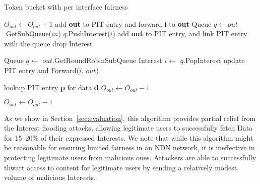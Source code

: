 \begin{algorithm}[h]
\footnotesize
\caption{\small Token bucket with per interface fairness}
\label{alg:queuing}
\begin{algorithmic}[1]
     
\EndFor

\vspace{0.1cm}

     
        \State $O_{out} \leftarrow O_{out} + 1$  
        \State add \textbf{out} to PIT entry and forward \textbf{i} to \textbf{out}
    \Else
        \State Queue $q \leftarrow out$.GetSubQueue($in$)
           \State $q$.PushInterest($i$)
           \State add \textbf{out} to PIT entry, and link PIT entry with the queue
        \Else
           \State drop Interest
        \EndIf
    \EndIf
\EndFunction

\vspace{0.1cm}

\State{} 
    \State Queue $q \leftarrow$ $out$.GetRoundRobinSubQueue 
    \State Interest $i \leftarrow$ $q$.PopInterest
    \State update PIT entry and Forward($i$, $out$)
\EndFunction

\vspace{0.1cm}

   \State lookup PIT entry \textbf{p} for data \textbf{d}
        \State $O_{out} \leftarrow O_{out} - 1$ 
   \EndFor
\EndFunction

\vspace{0.1cm}

        \State $O_{out} \leftarrow O_{out} - 1$ 
   \EndFor
\EndFunction


\end{algorithmic}
\end{algorithm}


As we show in Section~\ref{sec:evaluation}, this algorithm provides partial relief from the Interest flooding attacks, allowing legitimate users to successfully fetch Data for 15--20\% of their expressed Interests. 
We note that while this algorithm might be reasonable for ensuring limited fairness in an NDN network, it is ineffective in protecting legitimate users from malicious ones. 
Attackers are able to successfully thwart access to content for legitimate users by sending a relatively modest volume of malicious Interests.


